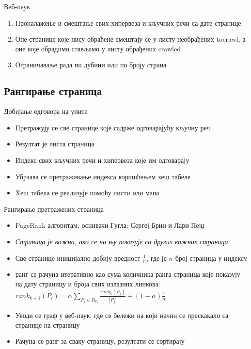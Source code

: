 \documentclass[11pt, serbianc, english]{beamer}
\begin{document}
\begin{frame}{Веб-паук}
    \begin{enumerate}
            \item Проналажење и смештање свих хипервеза и кључних речи са дате странице
            \pause
            \item Оне странице које нису обрађене смештају се у листу необрађених \alert{tocrawl}, а оне које обрадимо стављамо у листу обрађених \alert{crawled}
            \pause
            \item Ограничавање рада по дубини или по броју страна
    \end{enumerate}
\end{frame}

\subsection{Рангирање страница}

\begin{frame}{Добијање одговора на упите}
    \begin{itemize}
            \item Претражују се све странице које садрже одговарајућу кључну реч
            \pause
            \item Резултат је листа страница
            \pause
            \item Индекс свих кључних речи и хипервеза које им одговарају
            \pause
            \item Убрзава се претраживање индекса коришћењем хеш табеле
            \pause
            \item Хеш табела се реализује помоћу листи или мапа
            \pause
    \end{itemize}
\end{frame}

\begin{frame}{Рангирање претражених страница}
    \begin{itemize}
            \item PageRank алгоритам, оснивачи Гугла: Сергеј Брин и Лари Пејџ
            \pause
            \item \emph{Страница је важна, ако се на њу показује са других важних страница}
            \pause
        \item Све странице иницијално добију вредност $\frac{1}{n}$, где је $n$ број страница у индексу
            \pause
        \item ранг се рачуна итеративно као сума количника ранга страница које показују на дату страницу и броја свих излазних линкова: $rank_{k+1}(P_{i})=\alpha \sum_{P_{j}\in B_{P_{i}}}\frac{rank_{k}(P_{j})}{\left |P_{j} \right |} + (1-\alpha)\frac{1}{n}$
            \pause
            \item Уводи се граф у веб-паук, где се бележи на који начин се прескакало са странице на страницу
                \pause
                \item Рачуна се ранг за сваку страницу, резултати се сортирају
    \end{itemize}
\end{frame}
\end{document}
